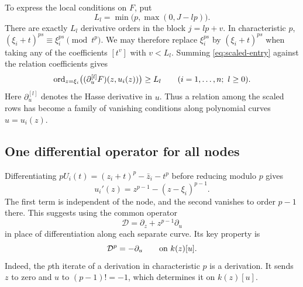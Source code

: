 To express the local conditions on $F$, put
\[
 L_l=\min\bigl(p,\max(0,J-lp)\bigr).
\]
There are exactly $L_l$ derivative orders in the block $j=lp+v$.
In characteristic $p$, $(\xi_i+t)^{ps}\equiv\xi_i^{ps}\pmod{t^p}$.
We may therefore replace $\xi_i^{ps}$ by $(\xi_i+t)^{ps}$ when taking any
of the coefficients $[t^v]$ with $v<L_l$. Summing \eqref{eq:scaled-entry}
against the relation coefficients gives
\begin{equation}\label{eq:local-hasse-vanish}
 \operatorname{ord}_{z=\xi_i}\bigl((\partial_u^{[l]}F)(z,u_i(z))\bigr)\geq L_l
 \qquad(i=1,\ldots,n;\ l\geq0).
\end{equation}
Here $\partial_u^{[l]}$ denotes the Hasse derivative in $u$. Thus a relation
among the scaled rows has become a family of vanishing conditions along
polynomial curves $u=u_i(z)$.

\subsection{One differential operator for all nodes}
Differentiating $pU_i(t)=(z_i+t)^p-\bar z_i-t^p$ before reducing modulo $p$
gives
\begin{equation}\label{eq:ui-prime}
 u_i'(z)=z^{p-1}-(z-\xi_i)^{p-1}.
\end{equation}
The first term is independent of the node, and the second vanishes to order
$p-1$ there. This suggests using the common operator
\[
 \mathcal D=\partial_z+z^{p-1}\partial_u
\]
in place of differentiation along each separate curve. Its key property is
\begin{equation}\label{eq:Dp-identity}
 \mathcal D^p=-\partial_u\qquad\hbox{on }k(z)[u].
\end{equation}
Indeed, the $p$th iterate of a derivation in characteristic $p$ is a derivation.
It sends $z$ to zero and $u$ to $(p-1)!=-1$, which determines it on $k(z)[u]$.

